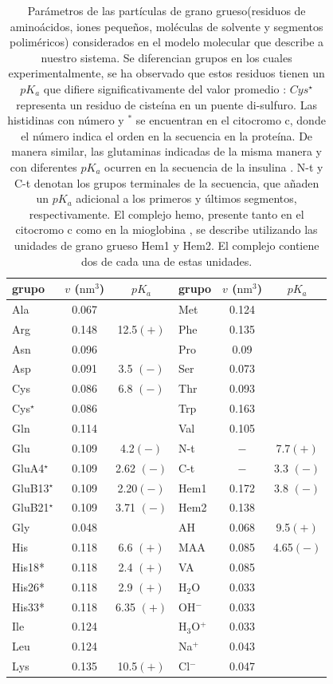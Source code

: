 \begin{table}[htb!]
	\centering
	\small
	\begin{tabular}{|lcc|lcc|}
		\hline
		grupo& $v$ ($\text{nm}^3$)& $pK_a$&  grupo& $v$ ($\text{nm}^3$)& $pK_a$\\
		\hline
		Ala & 0.067 & & Met& 0.124& \\
		Arg & 0.148 & 12.5$ (+)$& Phe& 0.135& \\
		Asn & 0.096 & & Pro& 0.09& \\
		Asp & 0.091 & 3.5 $(-)$& Ser& 0.073& \\
		Cys & 0.086 & 6.8 $(-)$& Thr& 0.093& \\
		Cys$^\star$ & 0.086 & & Trp& 0.163& \\
		Gln & 0.114 & & Val& 0.105& \\
		Glu & 0.109 & 4.2$ (-)$& N-t& ${-}$& 7.7$ (+)$\\
		GluA4$^\star$ & 0.109 & 2.62 $(-)$& C-t& ${-}$& 3.3 $(-)$\\
		GluB13$^\star$ & 0.109 & 2.20$ (-)$& Hem1& 0.172& 3.8 $(-)$\\ 
		GluB21$^\star$ & 0.109 & 3.71 $(-)$& Hem2& 0.138& \\
		Gly & 0.048 & & AH& 0.068& 9.5$(+)$\\
		His & 0.118 & 6.6 $(+)$& MAA& 0.085& 4.65$(-)$\\ 
		His18* & 0.118 & 2.4 $(+)$& VA& 0.085& \\
		His26* & 0.118 & 2.9 $(+)$& H$_2$O& 0.033& \\
		His33*& 0.118& 6.35 $(+)$& OH$^-$& 0.033&\\
		Ile& 0.124& & H$_3$O$^+$& 0.033&\\
		Leu& 0.124& & Na$^+$& 0.043&\\
		Lys& 0.135& 10.5$ (+)$& Cl$^-$& 0.047&\\
		\hline
	\end{tabular}
	\caption{Par\'ametros de las part\'iculas de  grano grueso(residuos de amino\'acidos, iones peque\~nos, mol\'eculas de solvente y segmentos polim\'ericos) considerados en el modelo molecular que describe a nuestro sistema.  Se diferencian grupos en los cuales experimentalmente, se ha observado que estos residuos tienen un $pK_a$ que difiere significativamente del valor promedio \cite{grimsley2009summary}:  $Cys^\star$ representa un residuo de ciste\'ina en un puente di-sulfuro. Las histidinas con  n\'umero y  $^\ast$ se encuentran en el citocromo c, donde el n\'umero indica el orden en la secuencia en la prote\'ina. De manera similar, las glutaminas indicadas de la misma manera y con diferentes $pK_a$ ocurren en la secuencia de la insulina \cite{grimsley2009summary}. N-t y C-t denotan los grupos terminales de la secuencia, que a\~naden un $pK_a$ adicional a los primeros y \'ultimos segmentos, respectivamente. El complejo hemo, presente tanto en el citocromo c como en la mioglobina \cite{mirkin2008high,hubbard1990x}, se describe utilizando las unidades de grano grueso Hem1 y Hem2. El complejo contiene dos de cada una de estas unidades.}
	\label{table:Coarse-grain} 
\end{table}



